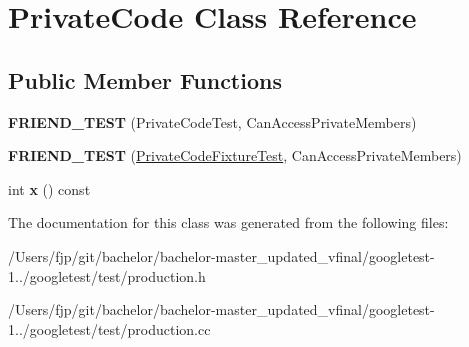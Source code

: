 \hypertarget{class_private_code}{}\section{Private\+Code Class Reference}
\label{class_private_code}
\subsection*{Public Member Functions}
\begin{DoxyCompactItemize}
\item 
\mbox{\label{class_private_code_a9a74a333501232539ab1636f0928d8f2}} 
{\bfseries F\+R\+I\+E\+N\+D\+\_\+\+T\+E\+ST} (Private\+Code\+Test, Can\+Access\+Private\+Members)
\item 
\mbox{\label{class_private_code_a29b6823300f68d78691476eeeaed8a7c}} 
{\bfseries F\+R\+I\+E\+N\+D\+\_\+\+T\+E\+ST} (\mbox{\hyperlink{classtesting_1_1_test}{Private\+Code\+Fixture\+Test}}, Can\+Access\+Private\+Members)
\item 
\mbox{\label{class_private_code_a247781246ce4d0c66563eaa39ba5aaa9}} 
int {\bfseries x} () const
\end{DoxyCompactItemize}


The documentation for this class was generated from the following files\+:\begin{DoxyCompactItemize}
\item 
/\+Users/fjp/git/bachelor/bachelor-\/master\+\_\+updated\+\_\+vfinal/googletest-\/1../googletest/test/production.\+h\item 
/\+Users/fjp/git/bachelor/bachelor-\/master\+\_\+updated\+\_\+vfinal/googletest-\/1../googletest/test/production.\+cc\end{DoxyCompactItemize}

